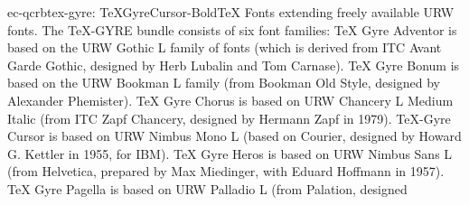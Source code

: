 \documentclass{ddltxtyp}
\begin{document}
\begin{package}{ec-qcrb}{tex-gyre: TeXGyreCursor-Bold}{{\TeX} Fonts extending freely available URW fonts.}
The {\TeX}-GYRE bundle consists of six font families: {\TeX} Gyre
Adventor is based on the URW Gothic L family of fonts (which is
derived from ITC Avant Garde Gothic, designed by Herb Lubalin
and Tom Carnase). {\TeX} Gyre Bonum is based on the URW Bookman L
family (from Bookman Old Style, designed by Alexander
Phemister). {\TeX} Gyre Chorus is based on URW Chancery L Medium
Italic (from ITC Zapf Chancery, designed by Hermann Zapf in
1979). {\TeX}-Gyre Cursor is based on URW Nimbus Mono L (based on
Courier, designed by Howard G. Kettler in 1955, for IBM). {\TeX}
Gyre Heros is based on URW Nimbus Sans L (from Helvetica,
prepared by Max Miedinger, with Eduard Hoffmann in 1957). {\TeX}
Gyre Pagella is based on URW Palladio L (from Palation,
designed %
\end{package}
\end{document}
